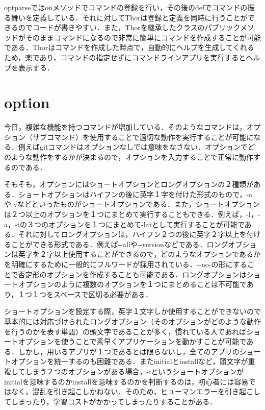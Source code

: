 optparseではonメソッドでコマンドの登録を行い，その後のdefでコマンドの振る舞いを定義している．それに対してThorは登録と定義を同時に行うことができるのでコードが書きやすい．また，Thorを継承したクラスのパブリックメソッドがそのままコマンドになるので非常に簡単にコマンドを作成することが可能である．Thorはコマンドを作成した時点で，自動的にヘルプを生成してくれるため，楽であり，コマンドの指定せずにコマンドラインアプリを実行するとヘルプを表示する．

    \section{option}\label{option}

今日，複雑な機能を持つコマンドが増加している．そのようなコマンドは，オプション（サブコマンド）を使用することで適切な動作を実行することが可能になる．例えばgitコマンドはオプションなしでは意味をなさない．オプションでどのような動作をするかが決まるので，オプションを入力することで正常に動作するのである．

そもそも，オプションにはショートオプションとロングオプションの２種類がある．ショートオプションはハイフンの後に英字１字を付けた形式のもので，-aや-vなどといったものがショートオプションである．また，ショートオプションは２つ以上のオプションを１つにまとめて実行することもできる．例えば，-l，-a，-tの３つのオプションを１つにまとめて-latとして実行することが可能である．それに対してロングオプションは，ハイフン２つの後に英字２字以上を付けることができる形式である．例えば-\/-allや-\/-versionなどである．ロングオプションは英字を２字以上使用することができるので，どのようなオプションであるかを明確にするために一般的にフルワードが採用されている．-\/-no-の形にすることで否定形のオプションを作成することも可能である．ロングオプションはショートオプションのように複数のオプションを１つにまとめることは不可能であり，１つ１つをスペースで区切る必要がある．

ショートオプションを設定する際，英字１文字しか使用することができないので基本的には対応づけられたロングオプション（そのオプションがどのような動作を行うのかを表す単語）の頭文字であることが多く，慣れている人であればショートオプションを使うことで素早くアプリケーションを動かすことが可能である．しかし，用いるアプリが１つであるとは限らないし，全てのアプリのショートオプションを統一するのも困難である．またinitialとinstallなど，頭文字が重複してしまう２つのオプションがある場合，-iというショートオプションがinitialを意味するのかinstallを意味するのかを判断するのは，初心者には容易ではなく，混乱を引き起こしかねない．そのため，ヒューマンエラーを引き起こしてしまったり，学習コストがかかってしまったりすることがある．

